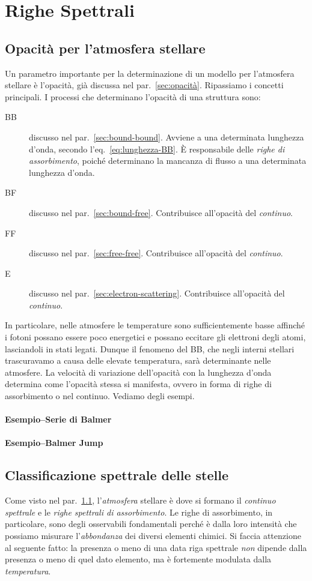 \section{Righe Spettrali}\label{sec:righe-spettrali}

\subsection{Opacità per l'atmosfera stellare}\label{sec:opacita-atmosfera}
Un parametro importante per la determinazione di un modello per l'atmosfera stellare è l'opacità, già discussa nel par.~\ref{sec:opacità}. Ripassiamo i concetti principali. I processi che determinano l'opacità di una struttura sono:
\begin{description}
    \item[BB] discusso nel par.~\ref{sec:bound-bound}. Avviene a una determinata lunghezza d'onda, secondo l'eq.~\eqref{eq:lunghezza-BB}. È responsabile delle \emph{righe di assorbimento}, poiché determinano la mancanza di flusso a una determinata lunghezza d'onda.
    \item[BF] discusso nel par.~\ref{sec:bound-free}. Contribuisce all'opacità del \emph{continuo}.
    \item[FF] discusso nel par.~\ref{sec:free-free}. Contribuisce all'opacità del \emph{continuo}.
    \item[E] discusso nel par.~\ref{sec:electron-scattering}. Contribuisce all'opacità del \emph{continuo}.
\end{description}
In particolare, nelle atmosfere le temperature sono sufficientemente basse affinché i fotoni possano essere poco energetici e possano eccitare gli elettroni degli atomi, lasciandoli in stati legati. Dunque il fenomeno del BB, che negli interni stellari trascuravamo a causa delle elevate temperatura, sarà determinante nelle atmosfere. La velocità di variazione dell'opacità con la lunghezza d'onda determina come l'opacità stessa si manifesta, ovvero in forma di righe di assorbimento o nel continuo. Vediamo degli esempi.

\paragraph{Esempio--Serie di Balmer}
\paragraph{Esempio--Balmer Jump}

\subsection{Classificazione spettrale delle stelle}
Come visto nel par.~\ref{sec:opacita-atmosfera}, l'\emph{atmosfera} stellare è dove si formano il \emph{continuo spettrale} e le \emph{righe spettrali di assorbimento}. Le righe di assorbimento, in particolare, sono degli osservabili fondamentali perché è dalla loro intensità che possiamo misurare l'\emph{abbondanza} dei diversi elementi chimici. Si faccia attenzione al seguente fatto: la presenza o meno di una data riga spettrale \emph{non} dipende dalla presenza o meno di quel dato elemento, ma è fortemente modulata dalla \emph{temperatura}.

